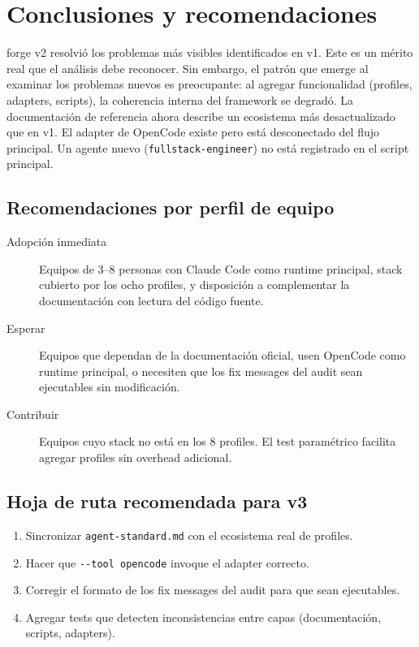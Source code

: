 \documentclass[12pt,a4paper]{article}
\begin{document}
\section{Conclusiones y recomendaciones}

forge v2 resolvi\'o los problemas m\'as visibles identificados en v1. Este es un
m\'erito real que el an\'alisis debe reconocer. Sin embargo, el patr\'on que
emerge al examinar los problemas nuevos es preocupante: al agregar funcionalidad
(profiles, adapters, scripts), la coherencia interna del framework se degrad\'o.
La documentaci\'on de referencia ahora describe un ecosistema m\'as desactualizado
que en v1. El adapter de OpenCode existe pero est\'a desconectado del flujo
principal. Un agente nuevo (\texttt{fullstack-engineer}) no est\'a registrado en
el script principal.

\subsection{Recomendaciones por perfil de equipo}

\begin{description}
  \item[Adopci\'on inmediata] Equipos de 3--8 personas con Claude Code como
    runtime principal, stack cubierto por los ocho profiles, y disposici\'on a
    complementar la documentaci\'on con lectura del c\'odigo fuente.

  \item[Esperar] Equipos que dependan de la documentaci\'on oficial, usen
    OpenCode como runtime principal, o necesiten que los fix messages del audit
    sean ejecutables sin modificaci\'on.

  \item[Contribuir] Equipos cuyo stack no est\'a en los 8 profiles. El test
    param\'etrico facilita agregar profiles sin overhead adicional.
\end{description}

\subsection{Hoja de ruta recomendada para v3}

\begin{enumerate}
  \item Sincronizar \texttt{agent-standard.md} con el ecosistema real de profiles.
  \item Hacer que \texttt{-{}-tool opencode} invoque el adapter correcto.
  \item Corregir el formato de los fix messages del audit para que sean ejecutables.
  \item Agregar tests que detecten inconsistencias entre capas (documentaci\'on,
    scripts, adapters).
\end{enumerate}
\end{document}

